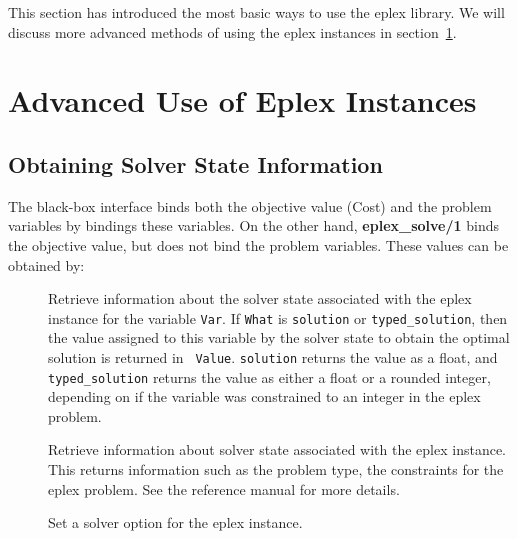 This section has introduced the most basic ways to use the eplex library. 
We will discuss more advanced methods of using the eplex instances in
section~\ref{eplex-instance-advanced}. 


\section{Advanced Use of Eplex Instances}
\label{eplex-instance-advanced}

\subsection{Obtaining Solver State Information}
\label{eplex-instance-solver-info}
The black-box interface binds both the objective value (Cost) and the
problem variables by bindings these variables. On the other hand, {\bf
  eplex_solve/1} binds the objective value, but does not bind the problem
variables. These values can be obtained by:

\begin{sloppypar}
\begin{description}
\item[]

Retrieve information about the solver state associated with the eplex
instance for the variable {\tt Var}. If {\tt What} is {\tt solution} or
{\tt typed_solution}, then the value assigned to this variable by the
solver state to obtain the optimal solution is returned in {\tt
Value}. {\tt solution} returns the value as a float, and {\tt
typed_solution} returns the value as either a float or a rounded integer, depending
on if the variable was constrained to an integer in the eplex problem.

\item[]

Retrieve information about solver state associated with the eplex instance.
This returns information such as the problem type, the constraints for the
eplex problem. See the reference manual for more details.

\item[]
Set a solver option for the eplex instance. 

\end{description}
\end{sloppypar}

